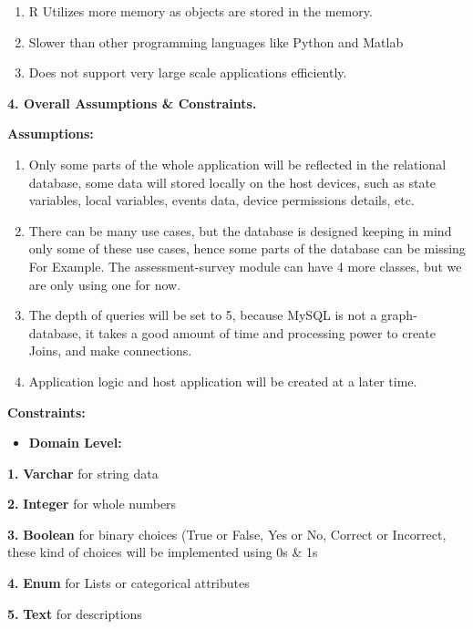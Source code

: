 \documentclass[
]{article}
\providecommand{\tightlist}{%
  \setlength{\itemsep}{0pt}\setlength{\parskip}{0pt}}
\begin{document}
\begin{enumerate}
\def\labelenumi{\arabic{enumi}.}
\item
  R Utilizes more memory as objects are stored in the memory.
\item
  Slower than other programming languages like Python and Matlab
\item
  Does not support very large scale applications efficiently.
\end{enumerate}

\textbf{4. Overall Assumptions \& Constraints.}

\textbf{Assumptions:}

\begin{enumerate}
\def\labelenumi{\arabic{enumi}.}
\item
  Only some parts of the whole application will be reflected in the
  relational database, some data will stored locally on the host
  devices, such as state variables, local variables, events data, device
  permissions details, etc.
\item
  There can be many use cases, but the database is designed keeping in
  mind only some of these use cases, hence some parts of the database
  can be missing For Example. The assessment-survey module can have 4
  more classes, but we are only using one for now.
\item
  The depth of queries will be set to 5, because MySQL is not a
  graph-database, it takes a good amount of time and processing power to
  create Joins, and make connections.
\item
  Application logic and host application will be created at a later
  time.
\end{enumerate}

\textbf{Constraints:}

\begin{itemize}
\tightlist
\item
  \textbf{Domain Level:}
\end{itemize}

\textbf{1.} \textbf{Varchar} for string data

\textbf{2.} \textbf{Integer} for whole numbers

\textbf{3.} \textbf{Boolean} for binary choices (True or False, Yes or
No, Correct or Incorrect, these kind of choices will be implemented
using 0s \& 1s

\textbf{4.} \textbf{Enum} for Lists or categorical attributes

\textbf{5.} \textbf{Text} for descriptions
\end{document}
